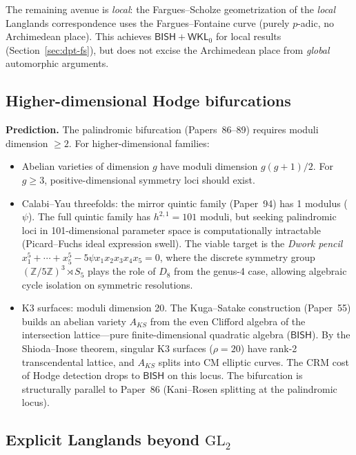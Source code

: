\documentclass[11pt,a4paper]{article}
\theoremstyle{plain}
\theoremstyle{definition}
\newcommand{\BISH}{\textsf{BISH}}
\newcommand{\WKL}{\textsf{WKL}_0}
\newcommand{\Z}{\mathbb{Z}}
\newcommand{\GL}{\mathrm{GL}}
\begin{document}
The remaining avenue is \emph{local}: the Fargues--Scholze geometrization of the \emph{local} Langlands correspondence uses the Fargues--Fontaine curve (purely $p$-adic, no Archimedean place). This achieves $\BISH + \WKL$ for local results (Section~\ref{sec:dpt-fs}), but does not excise the Archimedean place from \emph{global} automorphic arguments.

\subsection{Higher-dimensional Hodge bifurcations}

\textbf{Prediction.} The palindromic bifurcation (Papers~86--89) requires moduli dimension $\geq 2$. For higher-dimensional families:
\begin{itemize}
\item Abelian varieties of dimension $g$ have moduli dimension $g(g+1)/2$. For $g \geq 3$, positive-dimensional symmetry loci should exist.
\item Calabi--Yau threefolds: the mirror quintic family (Paper~94) has 1 modulus ($\psi$). The full quintic family has $h^{2,1} = 101$ moduli, but seeking palindromic loci in 101-dimensional parameter space is computationally intractable (Picard--Fuchs ideal expression swell). The viable target is the \emph{Dwork pencil} $x_1^5 + \cdots + x_5^5 - 5\psi x_1 x_2 x_3 x_4 x_5 = 0$, where the discrete symmetry group $(\Z/5\Z)^3 \rtimes S_5$ plays the role of $D_8$ from the genus-4 case, allowing algebraic cycle isolation on symmetric resolutions.
\item K3 surfaces: moduli dimension 20. The Kuga--Satake construction (Paper~55) builds an abelian variety $A_{KS}$ from the even Clifford algebra of the intersection lattice---pure finite-dimensional quadratic algebra ($\BISH$). By the Shioda--Inose theorem, singular K3 surfaces ($\rho = 20$) have rank-2 transcendental lattice, and $A_{KS}$ splits into CM elliptic curves. The CRM cost of Hodge detection drops to $\BISH$ on this locus. The bifurcation is structurally parallel to Paper~86 (Kani--Rosen splitting at the palindromic locus).
\end{itemize}

\subsection{Explicit Langlands beyond $\GL_2$}
\end{document}
